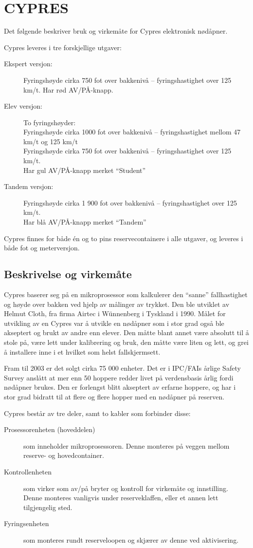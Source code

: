\section{CYPRES}
Det følgende beskriver bruk og virkemåte for Cypres elektronisk nødåpner.

Cypres leveres i tre forskjellige utgaver:
\begin{description}
\item[Ekspert versjon:] Fyringshøyde cirka 750 fot over bakkenivå – fyringshastighet over 125 km/t. Har rød AV/PÅ-knapp.
\item[Elev versjon:] To fyringshøyder: \\
Fyringshøyde cirka 1000 fot over bakkenivå – fyringshastighet mellom 47 km/t og 125 km/t \\
Fyringshøyde cirka 750 fot over bakkenivå – fyringshastighet over 125 km/t. \\
Har gul AV/PÅ-knapp merket ``Student''
\item[Tandem versjon:] Fyringshøyde cirka 1 900 fot over bakkenivå – fyringshastighet over 125 km/t. \\
Har blå AV/PÅ-knapp merket ``Tandem''
\end{description}

Cypres finnes for både én og to pins reservecontainere i alle utgaver, og leveres i både fot og meterversjon.

\subsection{Beskrivelse og virkemåte}
Cypres baserer seg på en mikroprosessor som kalkulerer den ``sanne'' fallhastighet og høyde over bakken ved hjelp av målinger av trykket. Den ble utviklet av Helmut Cloth, fra firma Airtec i Wünnenberg i Tyskland i 1990. Målet for utvikling av en Cypres var å utvikle en nødåpner som i stor grad også ble akseptert og brukt av andre enn elever. Den måtte blant annet være absolutt til å stole på, være lett under kalibrering og bruk, den måtte være liten og lett, og grei å installere inne i et hvilket som helst fallskjermsett.

Fram til 2003 er det solgt cirka 75 000 enheter. Det er i IPC/FAIs årlige Safety Survey anslått at mer enn 50 hoppere redder livet på verdensbasis årlig fordi nødåpner brukes. Den er forlengst blitt akseptert av erfarne hoppere, og har i stor grad bidratt til at flere og flere hopper med en nødåpner på reserven.

Cypres består av tre deler, samt to kabler som forbinder disse:
\begin{description}
\item[Prosessorenheten (hoveddelen)] som inneholder mikroprosessoren. Denne monteres på veggen mellom reserve- og hovedcontainer.
\item[Kontrollenheten] som virker som av/på bryter og kontroll for virkemåte og innstilling. Denne monteres vanligvis under reserveklaffen, eller et annen lett tilgjengelig sted.
\item[Fyringsenheten] som monteres rundt reserveloopen og skjærer av denne ved aktivisering.
\end{description}

